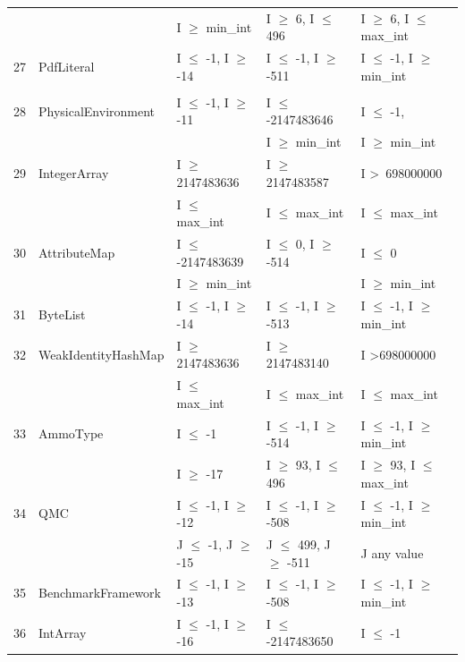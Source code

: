 {\begin{longtable}{|l|l|l|l|l|}
	&                                             & I $\ge$ min\_int					& I $\ge$ 6, I $\le$ 496			& I $\ge$ 6,  I $\le$ max\_int	\\	
27	& PdfLiteral					& I $\le$ -1, I $\ge$ -14			& I $\le$ -1, I $\ge$ -511			& I $\le$ -1, I $\ge$ min\_int	\\ 
	&							&								&								&									\\
\hline
28	& PhysicalEnvironment		& I $\le$ -1, I $\ge$ -11			& I $\le$ -2147483646			& I $\le$ -1, 							\\ 
	& 							& 								& I $\ge$ min\_int	 			& I $\ge$ min\_int				\\ 
29	& IntegerArray				& I $\ge$ 2147483636			& I $\ge$ 2147483587			& I \textgreater~698000000					\\ 
	&                                             & I $\le$ max\_int					& I $\le$ max\_int					&  I $\le$ max\_int				\\	
30	& AttributeMap				& I $\le$ -2147483639			& I $\le$ 0, I $\ge$ -514			& I $\le$ 0								\\ 
	&                                             & I $\ge$ min\_int					& 								& I $\ge$ min\_int 			   	\\	
31	& ByteList					& I $\le$ -1, I $\ge$ -14			& I $\le$ -1, I $\ge$ -513			& I $\le$ -1, I $\ge$ min\_int	\\ 
32	& WeakIdentityHashMap		& I $\ge$ 2147483636			& I $\ge$ 2147483140			& I \textgreater 698000000					\\ 
	&                                             & I $\le$ max\_int					& I $\le$ max\_int					& I $\le$ max\_int					\\
33	& AmmoType				& I $\le$ -1						& I $\le$ -1, I $\ge$ -514			& I $\le$ -1, I $\ge$ min\_int	\\ 			
	&                                             & I $\ge$ -17					& I $\ge$ 93, I $\le$ 496			& I $\ge$ 93, 	I $\le$ max\_int	\\
34	& QMC						& I $\le$ -1, I $\ge$ -12			& I $\le$ -1, I $\ge$ -508			& I $\le$ -1, I $\ge$ min\_int	\\ 
	&                                             & J $\le$ -1, J $\ge$ -15			& J $\le$ 499, J $\ge$ -511		& J any value			 		  				\\	
35	& BenchmarkFramework		& I $\le$ -1, I $\ge$ -13			& I $\le$ -1, I $\ge$ -508			& I $\le$ -1, I $\ge$ min\_int	\\ 
36	& IntArray					& I $\le$ -1, I $\ge$ -16			& I $\le$ -2147483650			& I $\le$ -1								\\ 

\end{longtable}}
